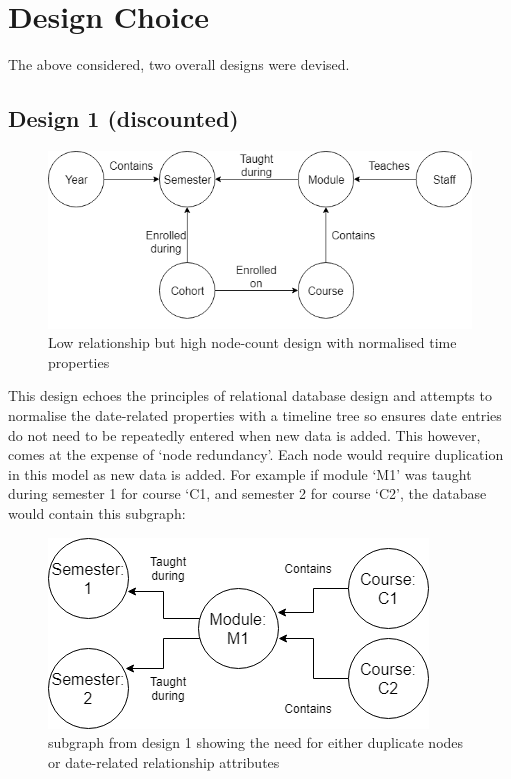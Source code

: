 \documentclass[10pt]{article}
\begin{document}
\section{Design Choice}
The above considered, two overall designs were devised.

\subsection{Design 1 (discounted)}

\begin{figure}[h]
\includegraphics[scale=0.35]{design2}
\centering
\caption{Low relationship but high node-count design with normalised time properties}
\end{figure}

This design echoes the principles of relational database design and attempts to normalise the date-related properties with a timeline tree \citep{graphDBs} so ensures date entries do not need to be repeatedly entered when new data is added. This however, comes at the expense of ‘node redundancy’. Each node would require duplication in this model as new data is added. For example if module ‘M1’ was taught during semester 1 for course ‘C1, and semester 2 for course ‘C2’, the database would contain this subgraph: 

\begin{figure}[h]
\includegraphics[scale=0.35]{subgraph}
\centering
\caption{subgraph from design 1 showing the need for either duplicate nodes or date-related relationship attributes}

\end{figure}
\end{document}
